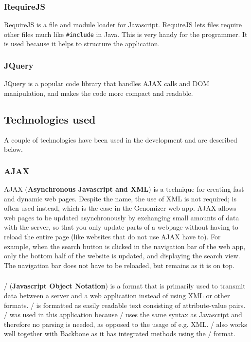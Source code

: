 \subsubsection{RequireJS}
RequireJS\cite{web_5} is a file and module loader for Javascript. RequireJS lets files require other files much like \texttt{\#include} in Java. This is very handy for the programmer. It is used because it helps to structure the application.

\subsubsection{JQuery}
JQuery\cite{web_6} is a popular code library that handles AJAX calls and DOM manipulation, and makes the code more compact and readable.


\subsection{Technologies used}
A couple of technologies have been used in the development and are described below.

\subsubsection{AJAX}
AJAX\cite{web_3} (\textbf{Asynchronous Javascript and XML}) is a technique for creating fast and dynamic web pages. Despite the name, the use of XML is not required; \json is often used instead, which is the case in the Genomizer web app. AJAX allows web pages to be updated asynchronously by exchanging small amounts of data with the server, so that you only update parts of a webpage without having to reload the entire page (like websites that do not use AJAX have to). For example, when the search button is clicked in the navigation bar of the web app, only the bottom half of the website is updated, and displaying the search view. The navigation bar does not have to be reloaded, but remains as it is on top.

\subsubsection{\json}
\json/\cite{web_4} (\textbf{Javascript Object Notation}) is a format that is primarily used to transmit data between a server and a web application instead of using XML or other formats.
\json/ is formatted as easily readable text consisting of attribute-value pairs.
\json/ was used in this application because \json/ uses the same syntax as Javascript and therefore no parsing is needed, as opposed to the usage of e.g. XML. \json/ also works well together with Backbone as it has integrated methods using the \json/ format.

